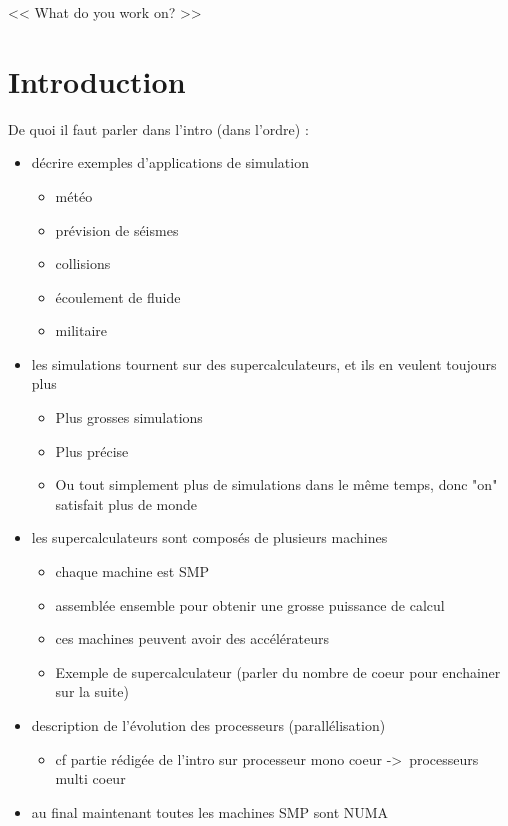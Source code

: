 \begin{savequote}[6cm]
<< What do you work on?  >>
\end{savequote}
\chapter{Introduction}
\chaptertoc

De quoi il faut parler dans l'intro (dans l'ordre) :

\begin{itemize}
  \item décrire exemples d'applications de simulation
  \begin{itemize}
    \item météo
    \item prévision de séismes
    \item collisions
    \item écoulement de fluide
    \item militaire
  \end{itemize}
  \item les simulations tournent sur des supercalculateurs, et ils en veulent toujours plus
  \begin{itemize}
    \item Plus grosses simulations
    \item Plus précise
    \item Ou tout simplement plus de simulations dans le même temps, donc "on" satisfait plus de monde
  \end{itemize}
  \item les supercalculateurs sont composés de plusieurs machines
  \begin{itemize}
    \item chaque machine est SMP
    \item assemblée ensemble pour obtenir une grosse puissance de calcul
    \item ces machines peuvent avoir des accélérateurs
    \item Exemple de supercalculateur (parler du nombre de coeur pour enchainer sur la suite)
  \end{itemize}
  \item description de l'évolution des processeurs (parallélisation)
  \begin{itemize}
    \item cf partie rédigée de l'intro sur processeur mono coeur -> processeurs multi coeur
  \end{itemize}
  \item au final maintenant toutes les machines SMP sont NUMA

\end{itemize}
